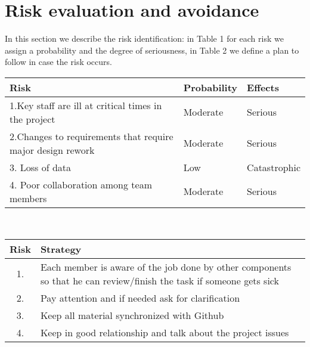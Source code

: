 \section {Risk evaluation and avoidance}

In this section we describe the risk identification: in Table 1 for each risk we assign a probability and the degree of seriousness, 
in Table 2 we define a plan to follow in case the risk occurs.\\
\newline
\begin{tabular}{  | l | l | l |}
    \hline
     Risk  & Probability  & Effects \\ \hline
    1.Key staff are ill at critical times in the project & Moderate & Serious  \\ \hline
    2.Changes to requirements that require major design rework & Moderate & Serious  \\ \hline
    3. Loss of data  & Low & Catastrophic \\ \hline
    4. Poor collaboration among team members & Moderate & Serious \\ \hline
\end{tabular}\\
\newline
\newline
\begin{tabular}{  | c |  p{14cm} |}
    \hline
    Risk  & Strategy \\ \hline
    1. & Each member is aware of the job done by other components so that he can review/finish the task if someone gets sick \\ \hline
    2. & Pay attention and if needed ask for clarification  \\ \hline
    3. & Keep all material synchronized with Github \\ \hline
    4. & Keep in good relationship and talk about the project issues \\ \hline
\end{tabular}